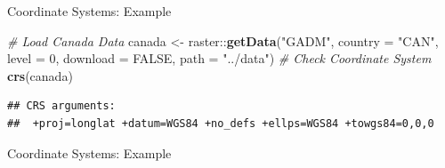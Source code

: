 \documentclass[10pt,ignorenonframetext,]{beamer}
\newenvironment{Shaded}{\begin{snugshade}}{\end{snugshade}}
\newcommand{\KeywordTok}[1]{\textcolor[rgb]{0.13,0.29,0.53}{\textbf{{#1}}}}
\newcommand{\DataTypeTok}[1]{\textcolor[rgb]{0.13,0.29,0.53}{{#1}}}
\newcommand{\DecValTok}[1]{\textcolor[rgb]{0.00,0.00,0.81}{{#1}}}
\newcommand{\StringTok}[1]{\textcolor[rgb]{0.31,0.60,0.02}{{#1}}}
\newcommand{\CommentTok}[1]{\textcolor[rgb]{0.56,0.35,0.01}{\textit{{#1}}}}
\newcommand{\OtherTok}[1]{\textcolor[rgb]{0.56,0.35,0.01}{{#1}}}
\newcommand{\NormalTok}[1]{{#1}}
\providecommand{\tightlist}{%
  \setlength{\itemsep}{0pt}\setlength{\parskip}{0pt}}
\begin{document}
\begin{frame}[fragile]{Coordinate Systems: Example}


\begin{Shaded}
\begin{Highlighting}[]
\CommentTok{# Load Canada Data}
\NormalTok{canada <-}\StringTok{ }\NormalTok{raster::}\KeywordTok{getData}\NormalTok{(}\StringTok{"GADM"}\NormalTok{, }\DataTypeTok{country =} \StringTok{"CAN"}\NormalTok{, }
    \DataTypeTok{level =} \DecValTok{0}\NormalTok{, }\DataTypeTok{download =} \OtherTok{FALSE}\NormalTok{, }\DataTypeTok{path =} \StringTok{"../data"}\NormalTok{)}
\CommentTok{# Check Coordinate System}
\KeywordTok{crs}\NormalTok{(canada)}
\end{Highlighting}
\end{Shaded}

\begin{verbatim}
## CRS arguments:
##  +proj=longlat +datum=WGS84 +no_defs +ellps=WGS84 +towgs84=0,0,0
\end{verbatim}

\end{frame}

\begin{frame}{Coordinate Systems: Example}

\end{frame}
\end{document}
